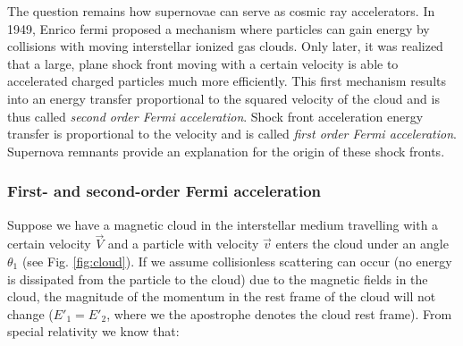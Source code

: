 The question remains how supernovae can serve as cosmic ray accelerators. In 1949, Enrico fermi proposed a mechanism where particles can gain energy by collisions with moving interstellar ionized gas clouds. Only later, it was realized that a large, plane shock front moving with a certain velocity is able to accelerated charged particles much more efficiently. This first mechanism results into an energy transfer proportional to the squared velocity of the cloud and is thus called \textit{second order Fermi acceleration}. Shock front acceleration energy transfer is proportional to the velocity and is called \textit{first order Fermi acceleration}. Supernova remnants provide an explanation for the origin of these shock fronts.


\subsubsection{First- and second-order Fermi acceleration}
\label{subsubsec:fermiacceleration}

Suppose we have a magnetic cloud in the interstellar medium travelling with a certain velocity $\vec{V}$ and a particle with velocity $\vec{v}$ enters the cloud under an angle $\theta_1$ (see Fig. \ref{fig:cloud}). If we assume collisionless scattering can occur (no energy is dissipated from the particle to the cloud) due to the magnetic fields in the cloud, the magnitude of the momentum in the rest frame of the cloud will not change ($E'_1 = E'_2$, where we the apostrophe denotes the cloud rest frame). From special relativity we know that:


